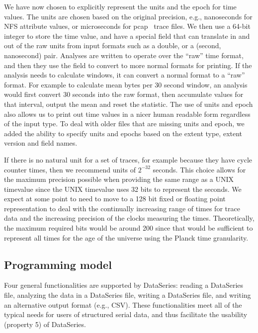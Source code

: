 \documentclass{acm_proc_article-sp}
\begin{document}
We have now chosen to explicitly represent the units and the epoch for
time values.  The units are chosen based on the original precision,
e.g., nanoseconds for NFS attribute values, or microseconds for pcap~\cite{libpcap}
trace files.  We then use a 64-bit integer to store the time value,
and have a special field that can translate in and out of the raw
units from input formats such as a double, or a (second, nanosecond)
pair.  Analyses are written to operate over the ``raw'' time format,
and then they use the field to convert to more normal formats for
printing.  If the analysis needs to calculate windows, it can convert
a normal format to a ``raw'' format.  For example to calculate mean
bytes per 30 second window, an analysis would first convert 30 seconds
into the raw format, then accumulate values for that
interval, output the mean and reset the statistic.  The use of units
and epoch also allows us to print out time values in a nicer human
readable form regardless of the input type.  To deal with older files
that are missing units and epoch, we added the ability to specify
units and epochs based on the extent type, extent version and field
names.

If there is no natural unit for a set of traces, for example because
they have cycle counter times, then we recommend units of $2^{-32}$
seconds.  This choice allows for the maximum precision possible when
providing the same range as a UNIX timevalue since the UNIX timevalue
uses 32 bits to represent the seconds.  We expect at some point to
need to move to a 128 bit fixed or floating point representation to
deal with the continually increasing range of times for trace data and
the increasing precision of the clocks measuring the times.  Theoretically,
the maximum required bits would be around 200 since that would be
sufficient to represent all times for the age of the universe
using the Planck time granularity.


\subsection{Programming model}

Four general functionalities are supported by DataSeries:
reading a DataSeries file, 
analyzing the data in a DataSeries file,
writing a DataSeries file,
and writing an alternative output format (e.g., CSV).
These functionalities meet all of the typical needs for
users of structured serial data, and thus facilitate
the usability (property 5) of DataSeries.
\end{document}
